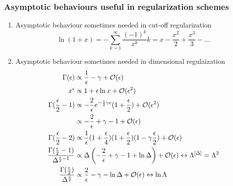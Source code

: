 \subsubsection{Asymptotic behaviours useful in regularization schemes}
\begin{enumerate}
	\item Asymptotic behaviour sometimes needed in cut-off regularization
	\begin{equation}
	\ln(1+x) = -\sum_{k=1}^\infty \frac{(-1)^k}{x^k} k = x-\frac{x^2}{2} + \frac{x^3}{3 } - \dots
	\end{equation}
	\item Asymptotic behaviour sometimes needed in dimensional regulaization
	\begin{align}
	\Gamma(\epsilon)& \propto \frac{1}{ \epsilon} - \gamma + \mathcal{O}(\epsilon)\\
	x^\epsilon &\propto 1+\epsilon \ln x + \mathcal{O}( \epsilon^2)\\
	\Gamma (\frac{\epsilon}{2}-1) &\propto -\frac{2}{\epsilon} e^{-\frac{1}{2} \gamma \epsilon} (1+\frac{\epsilon}{2}) + \mathcal{O}(\epsilon^2) \nonumber \\
	&\propto -\frac{2}{\epsilon} + \gamma -1 + \mathcal{O}(\epsilon)\\
	\Gamma(\frac{\epsilon}{2}-2) &\propto \frac{1}{\epsilon} (1 + \frac{\epsilon}{4}) (1+\frac{\epsilon}{2}) (1 - \gamma \frac{\epsilon}{2}) + \mathcal{O}(\epsilon)\\
	\frac{\Gamma(\frac{\epsilon}{2} -1)}{\Delta^{\frac{\epsilon}{2}-1} } &\propto \Delta \left(-\frac{2}{\epsilon} + \gamma -1 +\ln \Delta\right) + \mathcal{O}(\epsilon) \leftrightarrow \Lambda^{[\Delta]} = \Lambda^2 \\
	\frac{\Gamma(\frac{\epsilon}{2})}{\Delta^{\frac{\epsilon}{2}}} &\propto \frac{2}{\epsilon} - \gamma - \ln \Delta + \mathcal{O}(\epsilon) \leftrightarrow \ln \Lambda
	\end{align}
\end{enumerate}

